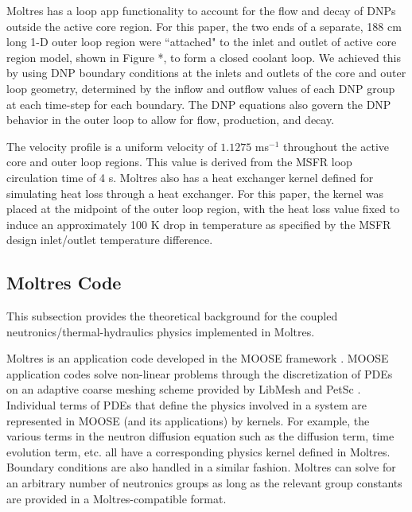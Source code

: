 \documentclass{anstrans}
\begin{document}
	Moltres has a loop app functionality to account for the flow and decay of
	\glspl{DNP} outside the active core region. For this paper, the two ends of
	a separate, 188 cm long 1-D outer
	loop region were ``attached" to the inlet and outlet of active core region
	model, shown in Figure *, to form a closed coolant loop. We achieved this
	by using \gls{DNP} boundary
	conditions at the inlets and outlets of the core and outer loop geometry,
	determined by the inflow and outflow values of each \gls{DNP} group at
	each time-step for each boundary.
	The \gls{DNP} equations also govern the \gls{DNP} behavior in the outer
	loop to allow for flow, production, and decay.
	
	The velocity profile is a uniform velocity of $1.1275$ ms$^{-1}$ throughout
	the active core and outer loop regions. This value is derived from the
	\gls{MSFR} loop circulation time of 4 s. Moltres also has a heat exchanger
	kernel defined for simulating heat loss through
	a heat exchanger. For this paper, the kernel was placed at the midpoint of
	the outer loop region, with the heat loss value fixed to induce an
	approximately 100 K
	drop in temperature as specified by the \gls{MSFR} design inlet/outlet
	temperature difference.

\subsection{\textbf{Moltres Code}}

	This subsection provides the theoretical background for the coupled
	neutronics/thermal-hydraulics physics implemented in Moltres.
	
	Moltres is an application code developed in the \gls{MOOSE} framework
	\cite{gaston_moose:_2009}. \gls{MOOSE} application codes solve non-linear
	problems through the discretization of \glspl{PDE} on an adaptive coarse
	meshing scheme provided by LibMesh \cite{kirk_libmesh:_2006} and PetSc
	\cite{satish_balay_petsc_2015}. Individual terms of \glspl{PDE} that define
	the physics involved in a system are represented in \gls{MOOSE} (and its
	applications) by kernels. For example, the various terms in the neutron
	diffusion equation such as the diffusion term, time evolution term, etc.
	all have a corresponding physics kernel defined in Moltres. Boundary
	conditions are also handled in a similar fashion. Moltres can solve for an
	arbitrary number of neutronics groups as long as the relevant group
	constants are provided in a Moltres-compatible format.
\end{document}
